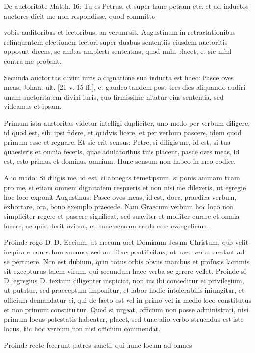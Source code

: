 \marginpar{\small[301]} De auctoritate Matth. 16: Tu es Petrus, et super hanc petram etc. et ad inductos auctores dicit me non respondisse, quod committo

vobis auditoribus et lectoribus, an verum sit. Augustinum in retractationibus relinquentem electionem lectori super duabus sententiis eiusdem auctoritis opposuit dicens, se ambas amplecti sententias, quod mihi placet, et sic nihil contra me probant.

Secunda auctoritas divini iuris a dignatione sua inducta est haec: Pasce oves meas, Johan. ult. [21 v. 15 ff.], et gaudeo tandem post tres dies aliquando audiri unam auctoritatem divini iuris, quo firmissime nitatur eius sententia, sed videamus et ipsam.

Primum ista auctoritas videtur intelligi dupliciter, uno modo per verbum diligere, id quod est, sibi ipsi fidere, et quidvis licere, et per verbum pascere, idem quod primum esse et regnare. Et sic erit sensus: Petre, si diligis me, id est, si tua quaesieris et omnia feceris, quae adulatoribus tuis placent, pasce oves meas, id est, esto primus et dominus omnium. Hunc sensum non habeo in meo codice.

Alio modo: Si diligis me, id est, si abnegas temetipsum, si ponis animam tuam pro me, si etiam omnem dignitatem respueris et non nisi me dilexeris, ut egregie hoc loco exponit Augustinus: Pasce oves meas, id est, doce, praedica verbum, exhortare, ora, bono exemplo praecede. Nam Graecum verbum hoc loco non simpliciter regere et pascere significat, sed suaviter et molliter curare et omnia facere, ne quid desit ovibus, et hunc sensum credo esse evangelicum.

Proinde rogo D. D. Eccium, ut mecum oret Dominum Jesum Christum, quo velit inspirare non solum summo, sed omnibus pontificibus, ut haec verba credant ad se pertinere. Non est dubium, quin totus orbis obviis manibus et profusis lacrimis sit excepturus talem virum, qui secundum haec verba se gerere vellet. Proinde si D. egregius D. textum diligenter inspiciat, non ius ibi conceditur et privilegium, ut putatur, sed praeceptum imponitur, et labor hodie intolerabilis iniungitur, et officium demandatur ei, qui de facto est vel in primo vel in medio loco constitutus et non primum constituitur. Quod si urgeat, officium non posse administrari, nisi primum locus potestatis habeatur, placet, sed tunc alio verbo struendus est iste locus, hic hoc verbum non nisi officium commendat.

Proinde recte fecerunt patres sancti, qui hunc locum ad omnes

